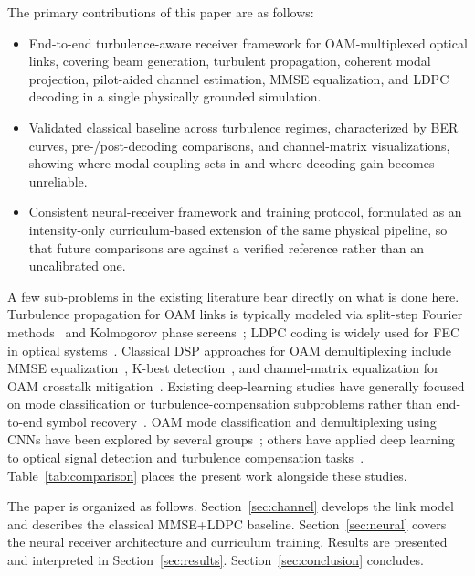 \documentclass[journal]{IEEEtran}
\begin{document}
The primary contributions of this paper are as follows:
\begin{itemize}
\item End-to-end turbulence-aware receiver framework for OAM-multiplexed optical links, covering beam generation, turbulent propagation, coherent modal projection, pilot-aided channel estimation, MMSE equalization, and LDPC decoding in a single physically grounded simulation.

\item Validated classical baseline across turbulence regimes, characterized by BER curves, pre-/post-decoding comparisons, and channel-matrix visualizations, showing where modal coupling sets in and where decoding gain becomes unreliable.

\item Consistent neural-receiver framework and training protocol, formulated as an intensity-only curriculum-based extension of the same physical pipeline, so that future comparisons are against a verified reference rather than an uncalibrated one.
\end{itemize}

A few sub-problems in the existing literature bear directly on what is done here. Turbulence propagation for OAM links is typically modeled via split-step Fourier methods~\cite{schmidt2010numerical} and Kolmogorov phase screens~\cite{andrews2005laser}; LDPC coding is widely used for FEC in optical systems~\cite{richardson2008modern}. Classical DSP approaches for OAM demultiplexing include MMSE equalization~\cite{huang2014100}, K-best detection~\cite{ge2021oam}, and channel-matrix equalization for OAM crosstalk mitigation~\cite{ren2014mimo_oam}. Existing deep-learning studies have generally focused on mode classification or turbulence-compensation subproblems rather than end-to-end symbol recovery~\cite{liu2019oam_prl, doster2017machine, karanov2018endtoend, zhao2020cnn}. OAM mode classification and demultiplexing using CNNs have been explored by several groups~\cite{doster2017machine, arya2023oam}; others have applied deep learning to optical signal detection and turbulence compensation tasks~\cite{lohani2018turbulence, karanov2018endtoend, zhao2020cnn}. Table~\ref{tab:comparison} places the present work alongside these studies.

The paper is organized as follows. Section~\ref{sec:channel} develops the link model and describes the classical MMSE+LDPC baseline. Section~\ref{sec:neural} covers the neural receiver architecture and curriculum training. Results are presented and interpreted in Section~\ref{sec:results}. Section~\ref{sec:conclusion} concludes.
\end{document}
